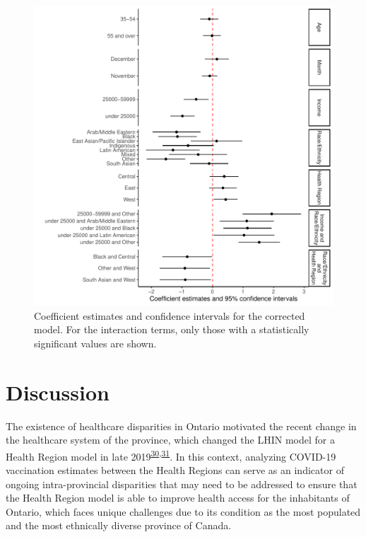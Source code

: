 \documentclass[
  letterpaper,
  DIV=11,
  numbers=noendperiod]{scrartcl}
\begin{document}
\begin{figure}

\includegraphics{main_files/figure-pdf/fig-model-corr-1.pdf} \hfill{}

\caption{\label{fig-model-corr}Coefficient estimates and confidence
intervals for the corrected model. For the interaction terms, only those
with a statistically significant values are shown.}

\end{figure}

\hypertarget{discussion}{%
\section{Discussion}\label{discussion}}

The existence of healthcare disparities in Ontario motivated the recent
change in the healthcare system of the province, which changed the LHIN
model for a Health Region model in late
2019\textsuperscript{\protect\hyperlink{ref-tsasis2012}{30},\protect\hyperlink{ref-dong2022}{31}}.
In this context, analyzing COVID-19 vaccination estimates between the
Health Regions can serve as an indicator of ongoing intra-provincial
disparities that may need to be addressed to ensure that the Health
Region model is able to improve health access for the inhabitants of
Ontario, which faces unique challenges due to its condition as the most
populated and the most ethnically diverse province of Canada.
\end{document}
